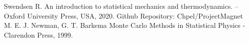 \begin{thebibliography}{9}
 Swendsen R. An introduction to statistical mechanics and thermodynamics. – Oxford University Press, USA, 2020.
 Github Repository: Chpel/ProjectMagnet
 M. E. J. Newman, G. T. Barkema Monte Carlo Methods in Statistical Physics - Clarendon Press, 1999.
\end{thebibliography}